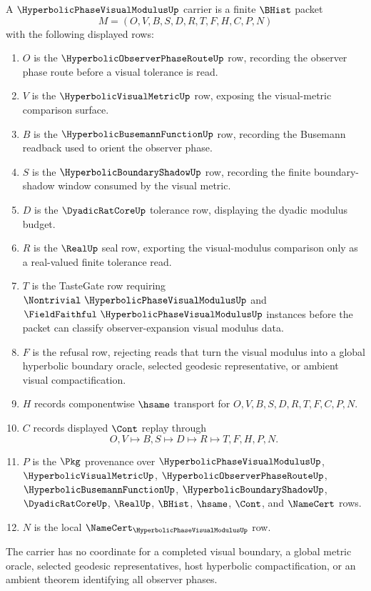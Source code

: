 \begin{definition}
\label{def:hyperbolic-phase-visual-modulus-carrier}
A $\HyperbolicPhaseVisualModulusUp$ carrier is a finite $\BHist$ packet
$$
M=(O,V,B,S,D,R,T,F,H,C,P,N)
$$
with the following displayed rows:
\begin{enumerate}
\item $O$ is the $\HyperbolicObserverPhaseRouteUp$ row, recording the observer phase route before a visual tolerance is read.
\item $V$ is the $\HyperbolicVisualMetricUp$ row, exposing the visual-metric comparison surface.
\item $B$ is the $\HyperbolicBusemannFunctionUp$ row, recording the Busemann readback used to orient the observer phase.
\item $S$ is the $\HyperbolicBoundaryShadowUp$ row, recording the finite boundary-shadow window consumed by the visual metric.
\item $D$ is the $\DyadicRatCoreUp$ tolerance row, displaying the dyadic modulus budget.
\item $R$ is the $\RealUp$ seal row, exporting the visual-modulus comparison only as a real-valued finite tolerance read.
\item $T$ is the TasteGate row requiring $\Nontrivial\ \HyperbolicPhaseVisualModulusUp$ and $\FieldFaithful\ \HyperbolicPhaseVisualModulusUp$ instances before the packet can classify observer-expansion visual modulus data.
\item $F$ is the refusal row, rejecting reads that turn the visual modulus into a global hyperbolic boundary oracle, selected geodesic representative, or ambient visual compactification.
\item $H$ records componentwise $\hsame$ transport for $O,V,B,S,D,R,T,F,C,P,N$.
\item $C$ records displayed $\Cont$ replay through
$$
O,V \longmapsto B,S \longmapsto D \longmapsto R \longmapsto T,F,H,P,N .
$$
\item $P$ is the $\Pkg$ provenance over $\HyperbolicPhaseVisualModulusUp$, $\HyperbolicVisualMetricUp$, $\HyperbolicObserverPhaseRouteUp$, $\HyperbolicBusemannFunctionUp$, $\HyperbolicBoundaryShadowUp$, $\DyadicRatCoreUp$, $\RealUp$, $\BHist$, $\hsame$, $\Cont$, and $\NameCert$ rows.
\item $N$ is the local $\NameCert_{\HyperbolicPhaseVisualModulusUp}$ row.
\end{enumerate}
The carrier has no coordinate for a completed visual boundary, a global metric oracle, selected geodesic representatives, host hyperbolic compactification, or an ambient theorem identifying all observer phases.
\end{definition}

